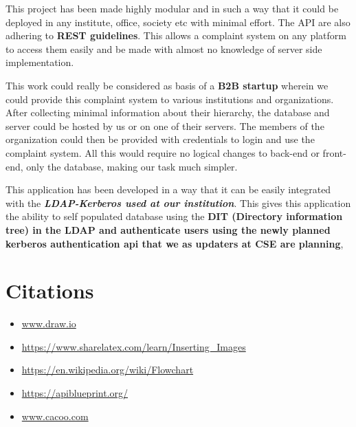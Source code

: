 \documentclass[12pt]{article}
\begin{document}
\par This project has been made highly modular and in such a way that it could be deployed in any institute, office, society etc with minimal effort. The API are also adhering to \textbf{REST guidelines}. This allows a complaint system on any platform to access them easily and be made with almost no knowledge of server side implementation.
\par This work could really be considered as basis of a \textbf{B2B startup} wherein we could provide this complaint system to various institutions and organizations. After collecting minimal information about their hierarchy, the database and server could be hosted by us or on one of their servers. The members of the organization could then be provided with credentials to login and use the complaint system. All this would require no logical changes to back-end or front-end, only the database, making our task much simpler.
\par This application has been developed in a way that it can be easily integrated with the \textbf{\textit{LDAP-Kerberos used at our institution}}. This gives this application the ability to self populated database using the \textbf{DIT (Directory information tree) in the LDAP and authenticate users using the newly planned kerberos authentication api that we as updaters at CSE are planning},


\section{Citations}
\begin{itemize}
\item \url{www.draw.io}
\item \url{https://www.sharelatex.com/learn/Inserting_Images}
\item \url{https://en.wikipedia.org/wiki/Flowchart}
\item \url{https://apiblueprint.org/}
\item \url {www.cacoo.com}
\end{itemize}





\end{document}
